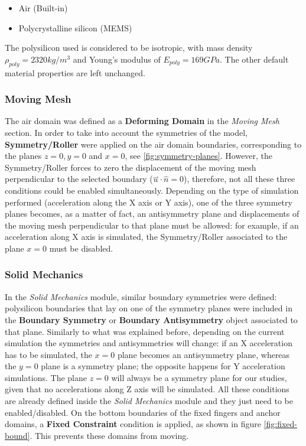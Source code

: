 \documentclass[lettersize,journal]{IEEEtran}
\begin{document}
        \begin{itemize}
            \item Air (Built-in)
            \item Polycrystalline silicon (MEMS)
        \end{itemize}
        
        The polysilicon used is considered to be isotropic, with mass density \(\rho _{poly} =2320kg/m^3\) and Young's modulus of \(E_{poly}=169GPa\). The other default material properties are left unchanged.
        
        \bigskip
         \subsubsection{Moving Mesh}
        The air domain was defined as a \textbf{Deforming Domain} in the \textit{Moving Mesh} section. In order to take into account the symmetries of the model, \textbf{Symmetry/Roller} were applied on the air domain boundaries, corresponding to the planes \(z=0, y=0\) and \(x=0\), see \ref{fig:symmetry-planes}. However, the Symmetry/Roller forces to zero the displacement of the moving mesh perpendicular to the selected boundary (\(\overset{\rightharpoonup}{u}\cdot\hat{n}=0\)), therefore, not all these three conditions could be enabled simultaneously. Depending on the type of simulation performed (acceleration along the X axis or Y axis), one of the three symmetry planes becomes, as a matter of fact, an antisymmetry plane and displacements of the moving mesh perpendicular to that plane must be allowed: for example, if an acceleration along X axis is simulated, the Symmetry/Roller associated to the plane \(x=0\) must be disabled.
        
        \bigskip
        \subsubsection{Solid Mechanics}
        
        In the \textit{Solid Mechanics} module, similar boundary symmetries were defined: polysilicon boundaries that lay on one of the symmetry planes were included in the \textbf{Boundary Symmetry} or \textbf{Boundary Antisymmetry} object associated to that plane. Similarly to what was explained before, depending on the current simulation the symmetries and antisymmetries will change: if an X acceleration has to be simulated, the \(x=0\) plane becomes an antisymmetry plane, whereas the \(y=0\) plane is a symmetry plane; the opposite happens for Y acceleration simulations. The plane \(z=0\) will always be a symmetry plane for our studies, given that no accelerations along Z axis will be simulated. All these conditions are already defined inside the \textit{Solid Mechanics} module and they just need to be enabled/disabled. On the bottom boundaries of the fixed fingers and anchor domains, a \textbf{Fixed Constraint} condition is applied, as shown in figure \ref{fig:fixed-bound}. This prevents these domains from moving.
        
\end{document}

